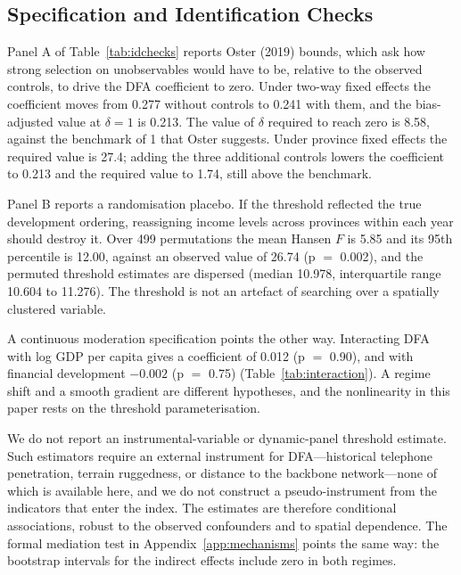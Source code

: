 \subsection{Specification and Identification Checks}\label{sec:identification}

Panel A of Table~\ref{tab:idchecks} reports Oster (2019) bounds, which ask how strong selection on unobservables would have to be, relative to the observed controls, to drive the DFA coefficient to zero. Under two-way fixed effects the coefficient moves from 0.277 without controls to 0.241 with them, and the bias-adjusted value at $\delta=1$ is 0.213. The value of $\delta$ required to reach zero is 8.58, against the benchmark of 1 that Oster suggests. Under province fixed effects the required value is 27.4; adding the three additional controls lowers the coefficient to 0.213 and the required value to 1.74, still above the benchmark.

Panel B reports a randomisation placebo. If the threshold reflected the true development ordering, reassigning income levels across provinces within each year should destroy it. Over 499 permutations the mean Hansen $F$ is 5.85 and its 95th percentile is 12.00, against an observed value of 26.74 (p $=$ 0.002), and the permuted threshold estimates are dispersed (median 10.978, interquartile range 10.604 to 11.276). The threshold is not an artefact of searching over a spatially clustered variable.

A continuous moderation specification points the other way. Interacting DFA with log GDP per capita gives a coefficient of 0.012 (p $=$ 0.90), and with financial development $-0.002$ (p $=$ 0.75) (Table~\ref{tab:interaction}). A regime shift and a smooth gradient are different hypotheses, and the nonlinearity in this paper rests on the threshold parameterisation.

We do not report an instrumental-variable or dynamic-panel threshold estimate. Such estimators require an external instrument for DFA---historical telephone penetration, terrain ruggedness, or distance to the backbone network---none of which is available here, and we do not construct a pseudo-instrument from the indicators that enter the index. The estimates are therefore conditional associations, robust to the observed confounders and to spatial dependence. The formal mediation test in Appendix~\ref{app:mechanisms} points the same way: the bootstrap intervals for the indirect effects include zero in both regimes.

